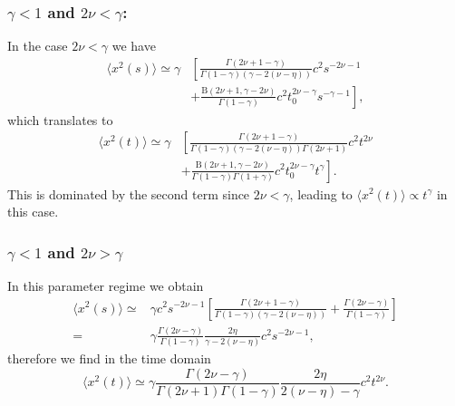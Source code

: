 \subsubsection{$\gamma<1$ and $2\nu < \gamma$: }
In the case  $2\nu < \gamma $ we have
\begin{equation}
\begin{split}
\langle x^2(s) \rangle  \simeq   \gamma  & \left[\frac{\Gamma(2\nu +1-\gamma)}{\Gamma(1-\gamma)(\gamma - 2(\nu-\eta))}c^2 s^{-2\nu -1} \right. \\
& \left. + \frac{\mathrm{B}(2\nu+1,\gamma-2\nu)}{\Gamma(1-\gamma)}c^2 t_0^{2\nu-\gamma} s^{-\gamma -1} \right] , 
\end{split}
\end{equation}
which translates to
\begin{equation}
\begin{split}
 \langle x^2(t) \rangle \simeq \gamma  & \left[\frac{\Gamma(2\nu +1-\gamma)}{\Gamma(1-\gamma)(\gamma-2(\nu-\eta))\Gamma(2\nu + 1)} c^2 t^{2\nu} \right. \\ 
 & \left.  + \frac{\mathrm{B}(2\nu+1,\gamma-2\nu)}{\Gamma(1-\gamma)\Gamma(1+\gamma)} c^2 t_0^{2\nu-\gamma} t^{\gamma} \right].
 \end{split}
\end{equation}
This is dominated by the second term since $2\nu < \gamma$, leading to  $\langle x^2(t) \rangle \propto t^\gamma$ in this case. 


\subsubsection{$\gamma<1$ and  $2\nu > \gamma$ }
In this parameter regime we obtain
\begin{align}
 \langle x^2(s) \rangle \simeq & \gamma c^2 s^{-2\nu-1}  \left[\frac{\Gamma(2\nu+1-\gamma)}{\Gamma(1-\gamma)(\gamma - 2(\nu-\eta))} +  \frac{\Gamma(2\nu-\gamma)}{\Gamma(1-\gamma)} \right]  \nonumber \\
 = & \gamma  \frac{\Gamma(2\nu -\gamma)}{\Gamma(1-\gamma)} \frac{2\eta }{\gamma - 2(\nu-\eta)}c^2  s^{-2\nu-1} ,
\end{align}
therefore we find in the time domain
\begin{equation}
 \langle x^2(t) \rangle \simeq \gamma \frac{\Gamma(2\nu -\gamma)} {\Gamma(2\nu+1) \Gamma(1-\gamma)} \frac{2\eta}{2(\nu-\eta)-\gamma}  c^2  t^{2\nu} .
\end{equation}

